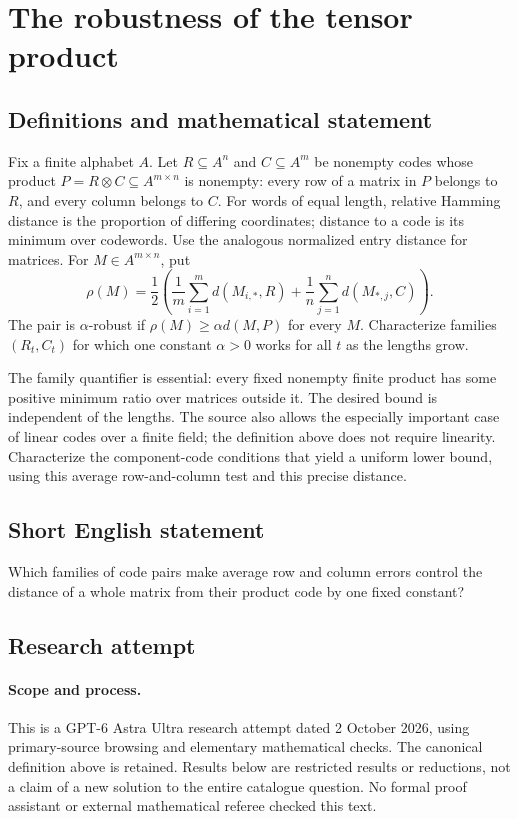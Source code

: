 \documentclass[11pt,a4paper]{article}
\begin{document}
\section*{The robustness of the tensor product}\label{statement}

\subsection{Definitions and mathematical statement}
Fix a finite alphabet $A$. Let $R\subseteq A^n$ and $C\subseteq A^m$
be nonempty codes whose product
$P=R\otimes C\subseteq A^{m\times n}$ is nonempty: every row of
a matrix in $P$ belongs to $R$, and every column belongs to $C$.
For words of equal length, relative Hamming distance is the proportion
of differing coordinates; distance to a code is its minimum over
codewords. Use the analogous normalized entry distance for matrices.
For $M\in A^{m\times n}$, put
\[
 \rho(M)=\frac12\left(\frac1m\sum_{i=1}^m d(M_{i,*},R)
                  +\frac1n\sum_{j=1}^n d(M_{*,j},C)\right).
\]
The pair is $\alpha$-robust if $\rho(M)\ge\alpha d(M,P)$ for every
$M$. Characterize families $(R_t,C_t)$ for which one constant
$\alpha>0$ works for all $t$ as the lengths grow.

The family quantifier is essential: every fixed nonempty finite
product has some positive minimum ratio over matrices outside it.
The desired bound is independent of the lengths. The source also
allows the especially important case of linear codes over a finite
field; the definition above does not require linearity. Characterize
the component-code conditions that yield a uniform lower bound,
using this average row-and-column test and this precise distance.
\subsection{Short English statement}
Which families of code pairs make average row and column errors control the distance of a whole matrix from their product code by one fixed constant?
\subsection{Research attempt}
\paragraph{Scope and process.}
This is a GPT-6 Astra Ultra research attempt dated 2 October 2026, using
primary-source browsing and elementary mathematical checks. The canonical
definition above is retained. Results below are restricted results or
reductions, not a claim of a new solution to the entire catalogue question.
No formal proof assistant or external mathematical referee checked this text.
\end{document}
